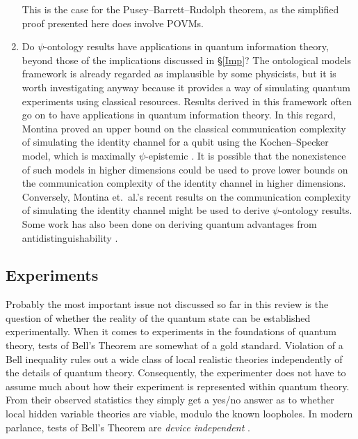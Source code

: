 \documentclass[DIV=calc,paper=a4,fontsize=11pt,twocolumn]{scrartcl} %
\theoremstyle{definition}
\theoremstyle{plain}
\begin{document}
\begin{enumerate}
This is the case for the Pusey--Barrett--Rudolph theorem, as the simplified proof
presented here does involve POVMs.
\item Do $\psi$-ontology results have applications in quantum
information theory, beyond those of the implications discussed in
\S\ref{Imp}?  The ontological models framework is already regarded
as implausible by some physicists, but it is worth investigating
anyway because it provides a way of simulating quantum experiments
using classical resources.  Results derived in this framework often
go on to have applications in quantum information theory.  In this
regard, Montina proved an upper bound on the classical communication
complexity of simulating the identity channel for a qubit using the
Kochen--Specker model, which is maximally $\psi$-epistemic
\cite{Montina2012}.  It is possible that the nonexistence of such
models in higher dimensions could be used to prove lower bounds on
the communication complexity of the identity channel in higher
dimensions.  Conversely, Montina et.\ al.'s recent results on the
communication complexity of simulating the identity channel
\cite{Montina2011a, Montina2013, Montina2014, Montina2014a} might be
used to derive $\psi$-ontology results.  Some work has also been
done on deriving quantum advantages from antidistinguishability
\cite{Bandyopadhyay2013, Perry2014}.
\end{enumerate}

\subsection{Experiments}

\label{Conc:Exp}

Probably the most important issue not discussed so far in this review
is the question of whether the reality of the quantum state can be
established experimentally.  When it comes to experiments in the
foundations of quantum theory, tests of Bell's Theorem are somewhat of
a gold standard.  Violation of a Bell inequality rules out a wide
class of local realistic theories independently of the details of
quantum theory.  Consequently, the experimenter does not have to
assume much about how their experiment is represented within quantum
theory.  From their observed statistics they simply get a yes/no
answer as to whether local hidden variable theories are viable, modulo
the known loopholes.  In modern parlance, tests of Bell's Theorem are
\emph{device independent} \cite{Brunner2013}.
\end{document}
